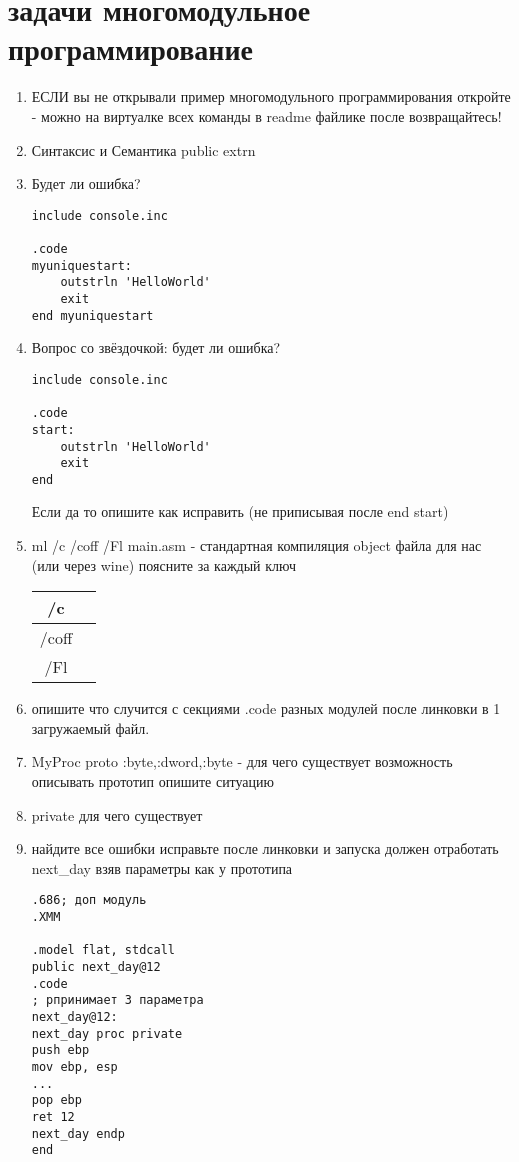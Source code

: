 \documentclass[a4paper,10pt]{article}
\begin{document}
\section*{задачи многомодульное программирование}
\begin{enumerate}
    
    \item ЕСЛИ вы не открывали пример многомодульного программирования откройте - можно на виртуалке всех команды в readme файлике после возвращайтесь!
    \item Синтаксис и Семантика public extrn
    \item Будет ли ошибка?
\begin{verbatim}
include console.inc

.code
myuniquestart: 
    outstrln 'HelloWorld'
    exit
end myuniquestart
\end{verbatim}
    \item Вопрос со звёздочкой: будет ли ошибка?
\begin{verbatim}
include console.inc

.code
start: 
    outstrln 'HelloWorld'
    exit
end
\end{verbatim}
    Если да то опишите как исправить (не приписывая после end start)
    \item ml /c /coff /Fl main.asm - стандартная компиляция object файла для нас (или через wine) поясните за каждый ключ \\
    \begin{tabular*}{15cm}{c|c}
        \hline
        /c &   \\
        \hline
        /coff & \\
        \hline
        /Fl & \\
        \hline
    \end{tabular*}
    \item опишите что случится с секциями .code разных модулей после линковки в 1 загружаемый файл.
    \item MyProc proto :byte,:dword,:byte - для чего существует возможность описывать прототип опишите ситуацию
    \item private для чего существует
    \item найдите все ошибки исправьте после линковки и запуска должен отработать next\_day взяв параметры как у прототипа
\begin{verbatim}
.686; доп модуль
.XMM

.model flat, stdcall
public next_day@12
.code
; рпринимает 3 параметра
next_day@12:
next_day proc private
push ebp
mov ebp, esp
...
pop ebp
ret 12
next_day endp
end
\end{verbatim}



\end{enumerate}
\end{document}
